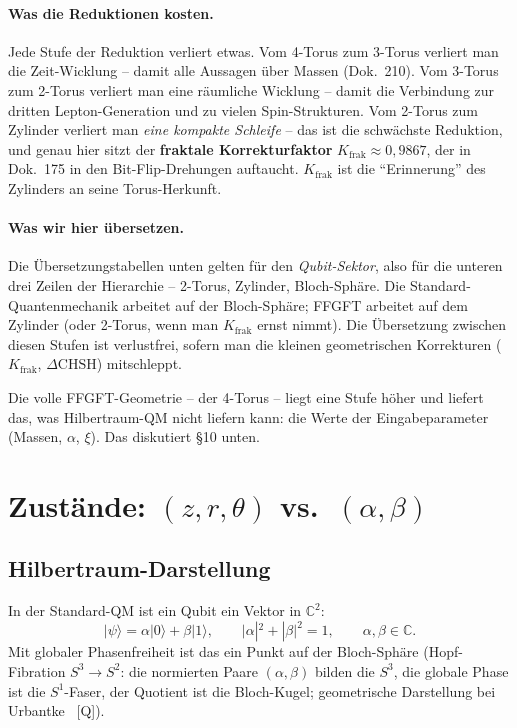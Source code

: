 \paragraph{Was die Reduktionen kosten.}
Jede Stufe der Reduktion verliert etwas. Vom 4-Torus zum 3-Torus
verliert man die Zeit-Wicklung -- damit alle Aussagen über Massen
(Dok.~210). Vom 3-Torus zum 2-Torus verliert man eine räumliche
Wicklung -- damit die Verbindung zur dritten Lepton-Generation und
zu vielen Spin-Strukturen. Vom 2-Torus zum Zylinder verliert man
\emph{eine kompakte Schleife} -- das ist die schwächste Reduktion,
und genau hier sitzt der \textbf{fraktale Korrekturfaktor}
$K_{\text{frak}} \approx 0{,}9867$, der in Dok.~175 in den
Bit-Flip-Drehungen auftaucht. $K_{\text{frak}}$ ist die
\enquote{Erinnerung} des Zylinders an seine Torus-Herkunft.

\paragraph{Was wir hier übersetzen.}
Die Übersetzungstabellen unten gelten für den \emph{Qubit-Sektor},
also für die unteren drei Zeilen der Hierarchie -- 2-Torus,
Zylinder, Bloch-Sphäre. Die Standard-Quantenmechanik arbeitet
auf der Bloch-Sphäre; FFGFT arbeitet auf dem Zylinder (oder
2-Torus, wenn man $K_{\text{frak}}$ ernst nimmt). Die Übersetzung
zwischen diesen Stufen ist verlustfrei, sofern man die kleinen
geometrischen Korrekturen ($K_{\text{frak}}$, $\Delta\text{CHSH}$)
mitschleppt.

Die volle FFGFT-Geometrie -- der 4-Torus -- liegt eine Stufe
höher und liefert das, was Hilbertraum-QM nicht liefern kann:
die Werte der Eingabeparameter (Massen, $\alpha$, $\xi$). Das
diskutiert §10 unten.

\section{\texorpdfstring{Zustände: $(z, r, \theta)$ vs.\ $(\alpha, \beta)$}{Zustaende: (z,r,theta) vs. (alpha,beta)}}

\subsection{Hilbertraum-Darstellung}

In der Standard-QM ist ein Qubit ein Vektor in $\mathbb{C}^2$:
\begin{equation}
  |\psi\rangle = \alpha|0\rangle + \beta|1\rangle,
  \qquad
  |\alpha|^2 + |\beta|^2 = 1,
  \qquad
  \alpha, \beta \in \mathbb{C}.
\end{equation}
Mit globaler Phasenfreiheit ist das ein Punkt auf der Bloch-Sphäre
(Hopf-Fibration $S^3 \to S^2$: die normierten Paare $(\alpha,\beta)$
bilden die $S^3$, die globale Phase ist die $S^1$-Faser, der
Quotient ist die Bloch-Kugel; geometrische Darstellung bei
Urbantke~\cite{urbantke2003} [Q]).

